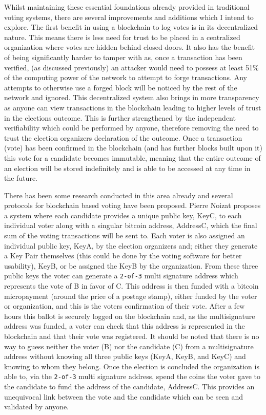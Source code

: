 \documentclass{article}
\begin{document}
Whilst maintaining these essential foundations already provided in traditional voting systems, there are several improvements and additions which I intend to explore. The first benefit in using a blockchain to log votes is in its decentralized nature. This means there is less need for trust to be placed in a centralized organization where votes are hidden behind closed doors. It also has the benefit of being significantly harder to tamper with as, once a transaction has been verified, (as discussed previously) an attacker would need to possess at least 51\% of the computing power of the network to attempt to forge transactions. Any attempts to otherwise use a forged block will be noticed by the rest of the network and ignored. This decentralized system also brings in more transparency as anyone can view transactions in the blockchain leading to higher levels of trust in the elections outcome. This is further strengthened by the independent verifiability which could be performed by anyone, therefore removing the need to trust the election organizers declaration of the outcome. Once a transaction (vote) has been confirmed in the blockchain (and has further blocks built upon it) this vote for a candidate becomes immutable, meaning that the entire outcome of an election will be stored indefinitely and is able to be accessed at any time in the future.

There has been some research conducted in this area already and several protocols for blockchain based voting have been proposed. Pierre Noizat proposes a system \citep{3_noizat_2016} where each candidate provides a unique public key, KeyC, to each individual voter along with a singular bitcoin address, AddressC, which the final sum of the voting transactions will be sent to. Each voter is also assigned an individual public key, KeyA, by the election organizers and; either they generate a Key Pair themselves (this could be done by the voting software for better usability), KeyB, or be assigned the KeyB by the organization. From these three public keys the voter can generate a \verb|2-of-3| multi signature address which represents the vote of B in favor of C. This address is then funded with a bitcoin micropayment (around the price of a postage stamp), either funded by the voter or organization, and this is the voters confirmation of their vote. After a few hours this ballot is securely logged on the blockchain and, as the multisignature address was funded, a voter can check that this address is represented in the blockchain and that their vote was registered. It should be noted that there is no way to guess neither the voter (B) nor the candidate (C) from a multisignature address without knowing all three public keys (KeyA, KeyB, and KeyC) and knowing to whom they belong. Once the election is concluded the organization is able to, via the \verb|2-of-3| multi signature address, spend the coins the voter gave to the candidate to fund the address of the candidate, AddressC. This provides an unequivocal link between the vote and the candidate which can be seen and validated by anyone.
\end{document}
